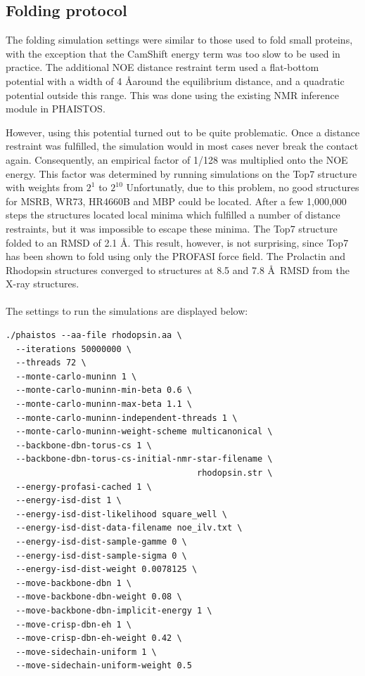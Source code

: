\subsection{Folding protocol}


The folding simulation settings were similar to those used to fold small proteins, with the exception that the CamShift energy term was too slow to be used in practice.
The additional NOE distance restraint term used a flat-bottom potential with a width of 4 \AA around the equilibrium distance, and a quadratic potential outside this range.
This was done using the existing NMR inference module in PHAISTOS.

However, using this potential turned out to be quite problematic. 
Once a distance restraint was fulfilled, the simulation would in most cases never break the contact again.
Consequently, an empirical factor of 1/128 was multiplied onto the NOE energy.
This factor was determined by running simulations on the Top7 structure with weights from $2^1$ to $2^{10}$
Unfortunatly, due to this problem, no good structures for MSRB, WR73, HR4660B and MBP could be located. 
After a few 1,000,000 steps the structures located local minima which fulfilled a number of distance restraints, but it was impossible to escape these minima.
The Top7 structure folded to an RMSD of 2.1 \AA.
This result, however, is not surprising, since Top7 has been shown to fold using only the PROFASI force field.
The Prolactin and Rhodopsin structures converged to structures at 8.5 and 7.8 \AA~RMSD from the X-ray structures.
\\\\The settings to run the simulations are displayed below:
\begin{lstlisting}
./phaistos --aa-file rhodopsin.aa \
  --iterations 50000000 \
  --threads 72 \
  --monte-carlo-muninn 1 \
  --monte-carlo-muninn-min-beta 0.6 \
  --monte-carlo-muninn-max-beta 1.1 \
  --monte-carlo-muninn-independent-threads 1 \
  --monte-carlo-muninn-weight-scheme multicanonical \
  --backbone-dbn-torus-cs 1 \
  --backbone-dbn-torus-cs-initial-nmr-star-filename \
                                      rhodopsin.str \
  --energy-profasi-cached 1 \
  --energy-isd-dist 1 \
  --energy-isd-dist-likelihood square_well \
  --energy-isd-dist-data-filename noe_ilv.txt \
  --energy-isd-dist-sample-gamme 0 \
  --energy-isd-dist-sample-sigma 0 \
  --energy-isd-dist-weight 0.0078125 \
  --move-backbone-dbn 1 \
  --move-backbone-dbn-weight 0.08 \
  --move-backbone-dbn-implicit-energy 1 \
  --move-crisp-dbn-eh 1 \
  --move-crisp-dbn-eh-weight 0.42 \
  --move-sidechain-uniform 1 \
  --move-sidechain-uniform-weight 0.5
\end{lstlisting}

